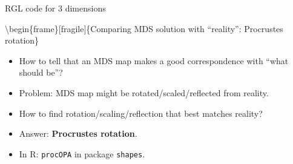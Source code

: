 \documentclass[ignorenonframetext,]{beamer}
\newenvironment{Shaded}{\begin{snugshade}}{\end{snugshade}}
\newcommand{\DataTypeTok}[1]{\textcolor[rgb]{0.13,0.29,0.53}{#1}}
\newcommand{\FloatTok}[1]{\textcolor[rgb]{0.00,0.00,0.81}{#1}}
\newcommand{\KeywordTok}[1]{\textcolor[rgb]{0.13,0.29,0.53}{\textbf{#1}}}
\newcommand{\NormalTok}[1]{#1}
\newcommand{\OperatorTok}[1]{\textcolor[rgb]{0.81,0.36,0.00}{\textbf{#1}}}
\begin{document}
\begin{frame}[fragile]{RGL code for 3 dimensions}
\protect\hypertarget{rgl-code-for-3-dimensions}{}

\begin{Shaded}
\end{Shaded}

\textbackslash{}begin\{frame\}{[}fragile{]}\{Comparing MDS solution with
``reality'': Procrustes rotation\}

\begin{itemize}
\item
  How to tell that an MDS map makes a good correspondence with ``what
  should be''?
\item
  Problem: MDS map might be rotated/scaled/reflected from reality.
\item
  How to find rotation/scaling/reflection that best matches reality?
\item
  Answer: \textbf{Procrustes rotation}.
\item
  In R: \texttt{procOPA} in package \texttt{shapes}.
\end{itemize}

\end{frame}
\end{document}
